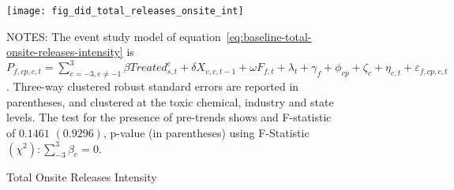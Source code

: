 \begin{figure}[H]
    \centering
    \texttt{[image: fig\_did\_total\_releases\_onsite\_int]}
    \caption{Total Onsite Releases Intensity}
    \label{fig:baseline-total-onsite-releases-intensity}
    \begin{minipage}{18cm}
        \vspace{0.05in}
        NOTES: The event study model of equation~\ref{eq:baseline-total-onsite-releases-intensity} is $P_{f,cp,c,t} = \sum_{{e = -3},{e \neq -1}}^{3} \beta Treated_{s,t}^e + \delta X_{v,c,t-1} + \omega F_{f,t} + \lambda_{t} + \gamma_{f} + \phi_{cp} + \zeta_{c} + \eta_{c,t} + \varepsilon_{f,cp,c,t}$. Three-way clustered robust standard errors are reported in parentheses, and clustered at the toxic chemical, industry and state levels. The test for the presence of pre-trends shows and F-statistic of $0.1461$ $(0.9296)$, p-value (in parentheses) using F-Statistic $(\chi^2): \sum_{-3}^{3} \beta_{e} = 0$.
    \end{minipage}
\end{figure}